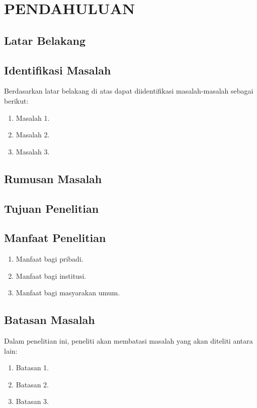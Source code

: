 \chapter{PENDAHULUAN}

\vspace{4.5pt}

\section{Latar Belakang} \label{sec:latar_belakang}
\blindtext

\blindtext
\section{Identifikasi Masalah}
Berdasarkan latar belakang di atas dapat diidentifikasi masalah-masalah sebagai berikut:
\begin{enumerate}[nolistsep,leftmargin=0.5cm]
\item Masalah 1.
\item Masalah 2.
\item Masalah 3.
\end{enumerate}

\section{Rumusan Masalah}

\section{Tujuan Penelitian}

\section{Manfaat Penelitian}
\begin{enumerate}[nolistsep,leftmargin=0.5cm]
\item Manfaat bagi pribadi.
\item Manfaat bagi institusi.
\item Manfaat bagi masyarakan umum.
\end{enumerate}

\section{Batasan Masalah}
Dalam penelitian ini, peneliti akan membatasi masalah yang akan diteliti antara lain:
\begin{enumerate}[nolistsep,leftmargin=0.5cm]
\item Batasan 1.
\item Batasan 2.
\item Batasan 3.
\end{enumerate}


